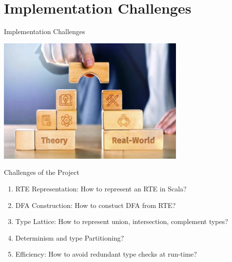 \section{Implementation Challenges}

{  
  \begin{frame}{Implementation Challenges}
      
  \centering
  \includegraphics[width=0.7\textwidth]{theoretic-challenge.png}
\end{frame}
}

\begin{frame}{Challenges of the Project}
  \begin{enumerate}
  \item RTE Representation:   How to represent an RTE in Scala?
  \item DFA Construction:  How to constuct DFA from RTE?
  \item Type Lattice: How to represent union, intersection, complement types?
  \item Determinism and type Partitioning?
  \item Efficiency:  How to avoid redundant type checks at run-time?
  \end{enumerate}
\end{frame}
